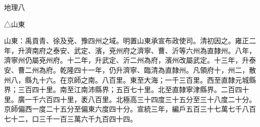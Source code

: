 
\begin{pinyinscope}
地理八

△山東

山東：禹貢青、徐及兗、豫四州之域。明置山東承宣布政使司。清初因之。雍正二年，升濟南府之泰安、武定、濱，兗州府之濟寧、曹、沂等六州為直隸州。八年，濟寧州仍屬兗州府。十二年，升武定、沂二州為府，濱州改屬武定。十三年，升泰安、曹二州為府。乾隆四十一年，仍升濟寧、臨清為直隸州。凡領府十，州二，散州八，縣九十六。在京師之南。八百里。東至大海；一千三百里。西至直隸元城縣界；三百四十里。南至江南沛縣界；五百七十里。北至直隸寧津縣界。二百四十里。廣一千六百四十里，袤八百里。北極高三十四度三十五分至三十八度二十分。京師偏西一度二十五分至偏東六度四十分。宣統三年，編戶五百三十七萬七千八百七十二，口三千一百三萬六千九百四十四。


\end{pinyinscope}

